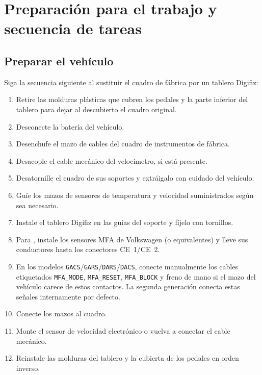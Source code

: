 \chapter{Preparación para el trabajo y secuencia de tareas}\label{ch:preparation}

\section{Preparar el vehículo}
Siga la secuencia siguiente al sustituir el cuadro de fábrica por un tablero Digifiz:
\begin{enumerate}
    \item Retire las molduras plásticas que cubren los pedales y la parte inferior del tablero para dejar al descubierto el cuadro original.
    \item Desconecte la batería del vehículo.
    \item Desenchufe el mazo de cables del cuadro de instrumentos de fábrica.
    \item Desacople el cable mecánico del velocímetro, si está presente.
    \item Desatornille el cuadro de sus soportes y extráigalo con cuidado del vehículo.
    \item Guíe los mazos de sensores de temperatura y velocidad suministrados según sea necesario.
    \item Instale el tablero Digifiz en las guías del soporte y fíjelo con tornillos.
    \item Para \ReplicaNextLong{}, instale los sensores MFA de Volkswagen (o equivalentes) y lleve sus conductores hasta los conectores CE~1/CE~2.
    \item En los modelos \texttt{GACS}/\texttt{GARS}/\texttt{DARS}/\texttt{DACS}, conecte manualmente los cables etiquetados \texttt{MFA\_MODE}, \texttt{MFA\_RESET}, \texttt{MFA\_BLOCK} y freno de mano si el mazo del vehículo carece de estos contactos. La segunda generación \ReplicaNextShort{} conecta estas señales internamente por defecto.
    \item Conecte los mazos al cuadro.
    \item Monte el sensor de velocidad electrónico o vuelva a conectar el cable mecánico.
    \item Reinstale las molduras del tablero y la cubierta de los pedales en orden inverso.
\end{enumerate}

